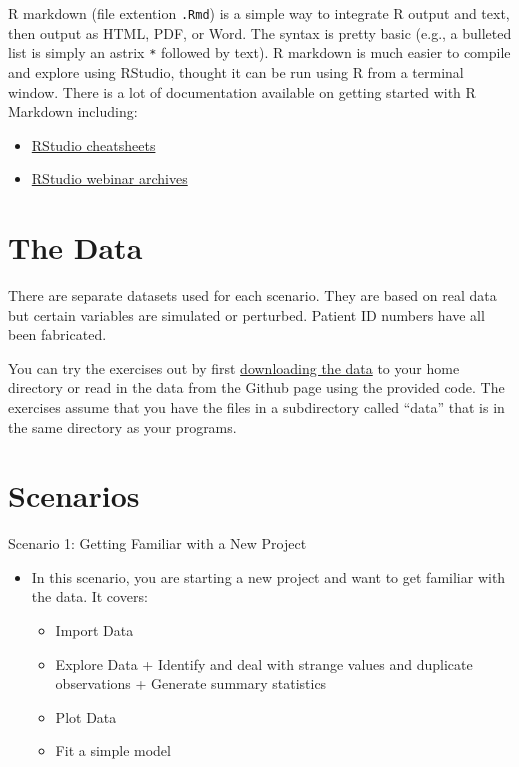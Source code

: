 \documentclass[
]{book}
\providecommand{\tightlist}{%
  \setlength{\itemsep}{0pt}\setlength{\parskip}{0pt}}
\begin{document}
R markdown (file extention \texttt{.Rmd}) is a simple way to integrate R output and text, then output as HTML, PDF, or Word. The syntax is pretty basic (e.g., a bulleted list is simply an astrix \texttt{*} followed by text). R markdown is much easier to compile and explore using RStudio, thought it can be run using R from a terminal window. There is a lot of documentation available on getting started with R Markdown including:

\begin{itemize}
\tightlist
\item
  \href{https://www.rstudio.com/resources/cheatsheets/}{RStudio cheatsheets}
\item
  \href{https://www.rstudio.com/resources/webinars/}{RStudio webinar archives}
\end{itemize}

\hypertarget{the-data}{%
\section{The Data}\label{the-data}}

There are separate datasets used for each scenario. They are based on real data but certain variables are simulated or perturbed. Patient ID numbers have all been fabricated.

You can try the exercises out by first \href{}{downloading the data} to your home directory or read in the data from the Github page using the provided code. The exercises assume that you have the files in a subdirectory called ``data'' that is in the same directory as your programs.

\hypertarget{scenarios}{%
\section{Scenarios}\label{scenarios}}

Scenario 1: Getting Familiar with a New Project

\begin{itemize}
\tightlist
\item
  In this scenario, you are starting a new project and want to get familiar with the data. It covers:

  \begin{itemize}
  \tightlist
  \item
    Import Data
  \item
    Explore Data
    + Identify and deal with strange values and duplicate observations
    + Generate summary statistics
  \item
    Plot Data
  \item
    Fit a simple model
  \end{itemize}
\end{itemize}
\end{document}
